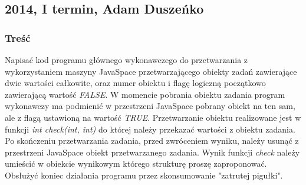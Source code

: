 	\subsection{2014, I termin, Adam Duszeńko}
		\subsubsection{Treść}
			Napisać kod programu głównego wykonawczego do przetwarzania z wykorzystaniem maszyny JavaSpace przetwarzającego obiekty zadań zawierające dwie wartości całkowite, oraz numer obiektu i flagę logiczną początkowo zawierającą wartość \textit{FALSE}. W momencie pobrania obiektu zadania program wykonawczy ma podmienić w przestrzeni JavaSpace pobrany obiekt na ten sam, ale z flagą ustawioną na wartość \textit{TRUE}. Przetwarzanie obiektu realizowane jest w funkcji \textit{int check(int, int)} do której należy przekazać wartości z obiektu zadania. Po skończeniu przetwarzania zadania, przed zwróceniem wyniku, należy usunąć z przestrzeni JavaSpace obiekt przetwarzanego zadania. Wynik funkcji \textit{check} należy umieścić w obiekcie wynikowym którego strukturę proszę zaproponować. Obsłużyć koniec działania programu przez skonsumowanie "zatrutej pigułki".
